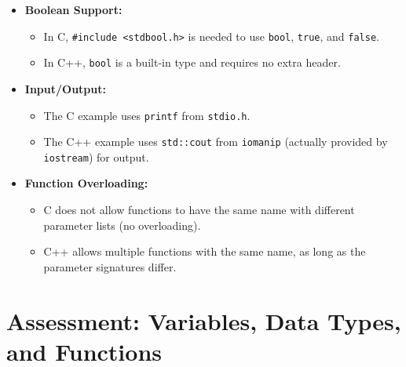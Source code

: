 \documentclass[a4paper,12pt]{article}
\begin{document}
\begin{itemize}
    \item \textbf{Boolean Support:} 
    \begin{itemize}
        \item In C, \texttt{\#include <stdbool.h>} is needed to use \texttt{bool}, \texttt{true}, and \texttt{false}.
        \item In C++, \texttt{bool} is a built-in type and requires no extra header.
    \end{itemize}

    \item \textbf{Input/Output:}
    \begin{itemize}
        \item The C example uses \texttt{printf} from \texttt{stdio.h}.
        \item The C++ example uses \texttt{std::cout} from \texttt{iomanip} (actually provided by \texttt{iostream}) for output.
    \end{itemize}

    \item \textbf{Function Overloading:}
    \begin{itemize}
        \item C does not allow functions to have the same name with different parameter lists (no overloading).
        \item C++ allows multiple functions with the same name, as long as the parameter signatures differ.
    \end{itemize}
\end{itemize}


\section*{Assessment: Variables, Data Types, and Functions}
\end{document}
